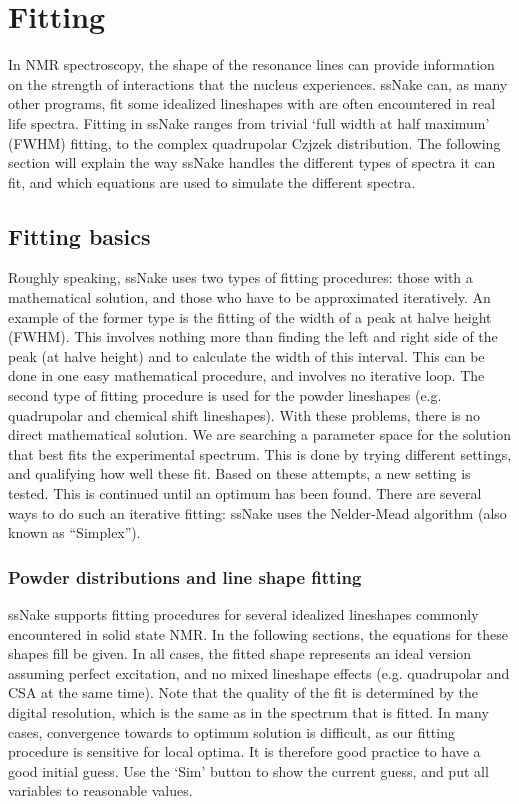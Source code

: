 \documentclass[11pt,a4paper]{article}
\begin{document}
\section{Fitting}
In NMR spectroscopy, the shape of the resonance lines can provide information on the strength of interactions that the nucleus experiences. ssNake can, as many other programs, fit some idealized lineshapes with are often encountered in real life spectra. Fitting in ssNake ranges from trivial `full width at half maximum' (FWHM) fitting, to the complex quadrupolar Czjzek distribution. The following section will explain the way ssNake handles the different types of spectra it can fit, and which equations are used to simulate the different spectra.

\subsection{Fitting basics}
Roughly speaking, ssNake uses two types of fitting procedures: those with a mathematical solution, and those who have to be approximated iteratively. An example of the former type is the fitting of the width of a peak at halve height (FWHM). This involves nothing more than finding the left and right side of the peak (at halve height) and to calculate the width of this interval. This can be done in one easy mathematical procedure, and involves no iterative loop. The second type of fitting procedure is used for the powder lineshapes (e.g. quadrupolar and chemical shift lineshapes). With these problems, there is no direct mathematical solution. We are searching a parameter space for the solution that best fits the experimental spectrum. This is done by trying different settings, and qualifying how well these fit. Based on these attempts, a new setting is tested. This is continued until an optimum has been found. There are several ways to do such an iterative fitting: ssNake uses the Nelder-Mead algorithm \cite{nelder1965simplex} (also known as ``Simplex'').

\subsubsection*{Powder distributions and line shape fitting}
ssNake supports fitting procedures for several idealized lineshapes commonly encountered in solid state NMR. In the following sections, the equations for these shapes fill be given. In all cases, the fitted shape represents an ideal version assuming perfect excitation, and no mixed lineshape effects (e.g. quadrupolar and CSA at the same time). Note that the quality of the fit is determined by the digital resolution, which is the same as in the spectrum that is fitted. In many cases, convergence towards to optimum solution is difficult, as our fitting procedure is sensitive for local optima. It is therefore good practice to have a good initial guess. Use the `Sim' button to show the current guess, and put all variables to reasonable values.
\end{document}
